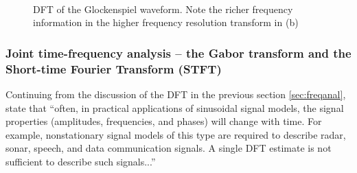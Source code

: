 \documentclass[report.tex]{subfiles}
\begin{document}
\begin{figure}[ht]
	\centering
	\\
	\caption{DFT of the Glockenspiel waveform. Note the richer frequency information in the higher frequency resolution transform in (b)}
	\label{fig:glockdft}
\end{figure}

\newpagefill

\subsubsection{Joint time-frequency analysis -- the Gabor transform and the Short-time Fourier Transform (STFT)}
\label{sec:jointtfa}

Continuing from the discussion of the DFT in the previous section \ref{sec:freqanal}, \textcite[Chapter~10]{discretebook} state that ``often, in practical applications of sinusoidal signal models, the signal properties (amplitudes, frequencies, and phases) will change with time. For example, nonstationary signal models of this type are required to describe radar, sonar, speech, and data communication signals. A single DFT estimate is not sufficient to describe such signals...''
\end{document}
